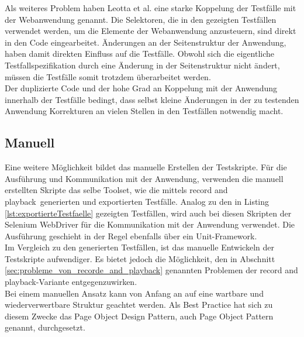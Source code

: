 Als weiteres Problem haben Leotta et al. \cite{leotta_repairing_2013} eine starke Koppelung der Testfälle mit der Webanwendung genannt. Die Selektoren, die in den gezeigten Testfällen verwendet werden, um die Elemente der Webanwendung anzusteuern, sind direkt in den Code eingearbeitet. Änderungen an der Seitenstruktur der Anwendung, haben damit direkten Einfluss auf die Testfälle.
Obwohl sich die eigentliche Testfallspezifikation durch eine Änderung in der Seitenstruktur nicht ändert, müssen die Testfälle somit trotzdem überarbeitet werden.\\
Der duplizierte Code und der hohe Grad an Koppelung mit der Anwendung innerhalb der Testfälle bedingt, dass selbst kleine Änderungen in der zu testenden Anwendung Korrekturen an vielen Stellen in den Testfällen notwendig macht.

\subsection{Manuell}
\label{sec:manuell}
Eine weitere Möglichkeit bildet das manuelle Erstellen der Testskripte. Für die Ausführung und Kommunikation mit der Anwendung, verwenden die manuell erstellten Skripte das selbe Toolset, wie die mittels \grq record and playback\grq\ generierten und exportierten Testfälle. Analog zu den in Listing \ref{lst:exportierteTestfaelle} gezeigten Testfällen, wird auch bei diesen Skripten der Selenium WebDriver für die Kommunikation mit der Anwendung verwendet. Die Ausführung geschieht in der Regel ebenfalls über ein Unit-Framework.\\
Im Vergleich zu den generierten Testfällen, ist das manuelle Entwickeln der Testskripte aufwendiger.
Es bietet jedoch die Möglichkeit, den in Abschnitt \ref{sec:probleme_von_recorde_and_playback} genannten Problemen der \grq record and playback\grq -Variante entgegenzuwirken.\\
Bei einem manuellen Ansatz kann von Anfang an auf eine wartbare und wiederverwertbare Struktur geachtet werden.
Als Best Practice hat sich zu diesem Zwecke das Page Object Design Pattern, auch Page Object Pattern genannt, durchgesetzt.

